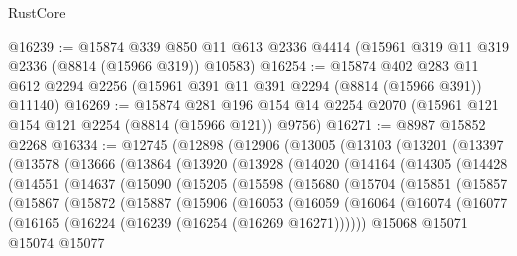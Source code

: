 \begin{lexlean}{RustCore}
\begin{coremodule}
@16239 := @15874
    @339
    @850
    @11
    @613
    @2336
    @4414
    (@15961 @319 @11 @319 @2336 (@8814 (@15966 @319)) @10583)
@16254 := @15874
    @402
    @283
    @11
    @612
    @2294
    @2256
    (@15961 @391 @11 @391 @2294 (@8814 (@15966 @391)) @11140)
@16269 := @15874
    @281
    @196
    @154
    @14
    @2254
    @2070
    (@15961 @121 @154 @121 @2254 (@8814 (@15966 @121)) @9756)
@16271 := @8987 @15852 @2268
@16334 := @12745
    (@12898
      (@12906
        (@13005
          (@13103
            (@13201
              (@13397
                (@13578
                  (@13666
                    (@13864
                      (@13920
                        (@13928
                          (@14020
                            (@14164
                              (@14305
                                (@14428
                                  (@14551
                                    (@14637
                                      (@15090
                                        (@15205
                                          (@15598
                                            (@15680
                                              (@15704
                                                (@15851
                                                  (@15857
                                                    (@15867
                                                      (@15872
                                                        (@15887
                                                          (@15906
                                                            (@16053
                                                              (@16059
                                                                (@16064
                                                                  (@16074
                                                                    (@16077
                                                                      (@16165
                                                                        (@16224
                                                                          (@16239
                                                                            (@16254
                                                                              (@16269 @16271))))))
                                                                    @15068
                                                                    @15071
                                                                    @15074
                                                                    @15077

\end{coremodule}
\end{lexlean}
